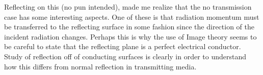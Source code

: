 Reflecting on this (no pun intended), made me realize that the no transmission case has some interesting aspects.  One of these is that radiation momentum must be transferred to the reflecting surface in some fashion since the direction of the incident radiation changes.  Perhaps this is why the use of Image theory seems to be careful to state that the reflecting plane is a perfect electrical conductor.  Study of reflection off of conducting surfaces is clearly in order to understand how this differs from normal reflection in transmitting media.
%
